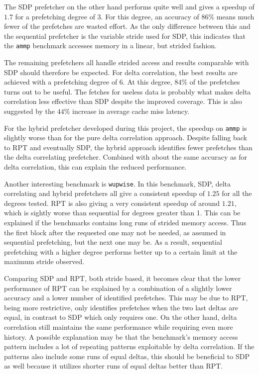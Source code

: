The SDP prefetcher on the other hand performs quite well and gives a speedup of
$1.7$ for a prefetching degree of $3$. For this degree, an accuracy of $86\%$
means much fewer of the prefetches are wasted effort.  As the only difference
between this and the sequential prefetcher is the variable stride used for SDP,
this indicates that the \texttt{ammp} benchmark accesses memory in a linear,
but strided fashion.  

The remaining prefetchers all handle strided access and results comparable with
SDP should therefore be expected.  For delta correlation, the best results are
achieved with a prefetching degree of $6$.  At this degree, $84\%$ of the
prefetches turns out to be useful.  The fetches for useless data is probably
what makes delta correlation less effective than SDP despite the improved
coverage.
This is also suggested by the $44\%$ increase in average cache miss latency.

For the hybrid prefetcher developed during this project, the speedup on \texttt{ammp} is slightly
worse than for the pure delta correlation approach.
Despite falling back to RPT and eventually SDP, the hybrid approach identifies
fewer prefetches than the delta correlating prefetcher.
Combined with about the same accuracy as for delta correlation, this can explain
the reduced performance.

Another interesting benchmark is \texttt{wupwise}.
In this benchmark, SDP, delta correlating and hybrid prefetchers all give a
consistent speedup of $1.25$ for all the degrees tested.
RPT is also giving a very consistent speedup of around $1.21$, which is sightly
worse than sequential for degrees greater than 1.
This can be explained if the benchmarks contains long runs of strided memory
access.
Thus the first block after the requested one may not be needed, as assumed in
sequential prefetching, but the next one may be.
As a result, sequential prefetching with a higher degree performs better up to a
certain limit at the maximum stride observed.

Comparing SDP and RPT, both stride based, it becomes clear that the lower
performance of RPT can be explained by a combination of a slightly lower
accuracy and a lower number of identified prefetches.
This may be due to RPT, being more restrictive, only identifies prefetches when
the two last deltas are equal, in contrast to SDP which only requires one.
On the other hand, delta correlation still maintains the same performance while
requiring even more history.
A possible explanation may be that the benchmark's memory access pattern
includes a lot of repeating patterns exploitable by delta correlation.
If the patterns also include some runs of equal deltas, this should be
beneficial to SDP as well because it utilizes shorter runs of equal deltas
better than RPT.


